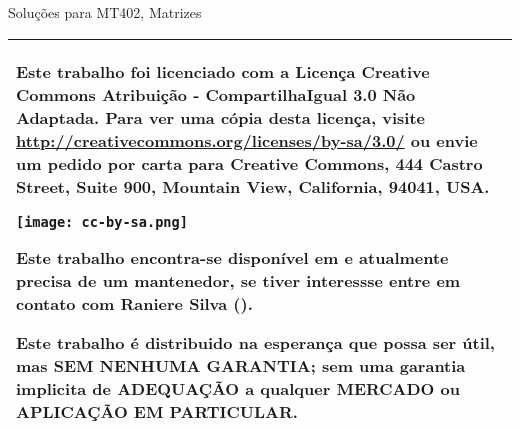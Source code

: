 % 
% 
% 
% 
% 
% 
%
%
\begin{center}
    \LARGE{Solu\c{c}\~{o}es para MT402, Matrizes}
\end{center}
\vspace{.5\textheight}

\begin{tabular}{|p{}|}
\hline
Este trabalho foi licenciado com a Licen\c{c}a Creative Commons Atribui\c{c}\~{a}o - CompartilhaIgual 3.0 N\~{a}o Adaptada. Para ver uma c\'{o}pia desta licen\c{c}a, visite \url{http://creativecommons.org/licenses/by-sa/3.0/} ou envie um pedido por carta para Creative Commons, 444 Castro Street, Suite 900, Mountain View, California, 94041, USA.
\begin{center}
\texttt{[image: cc-by-sa.png]}
\end{center}
Este trabalho encontra-se dispon\'{i}vel em  e atualmente precisa de um mantenedor, se tiver interessse entre em contato com Raniere Silva ().

Este trabalho \'{e} distribuido na esperança que possa ser \'{u}til, mas SEM NENHUMA GARANTIA; sem uma garantia implicita de ADEQUA\c{C}\~{A}O a qualquer MERCADO ou APLICA\c{C}\~{A}O EM PARTICULAR.
\\ \hline
\end{tabular}


